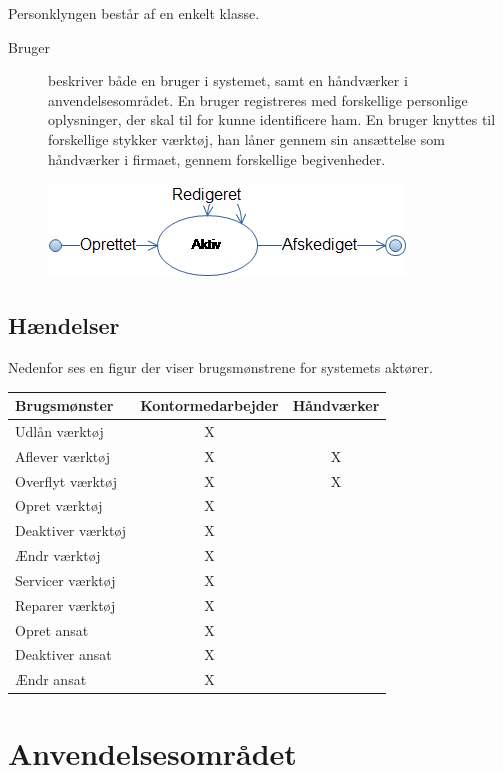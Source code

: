 \documentclass{article}
\begin{document}
Personklyngen består af en enkelt klasse.

\begin{description}

\item[Bruger] beskriver både en bruger i systemet, samt en håndværker i anvendelsesområdet. En bruger registreres med forskellige personlige oplysninger, der skal til for kunne identificere ham. En bruger knyttes til forskellige stykker værktøj, han låner gennem sin ansættelse som håndværker i firmaet, gennem forskellige begivenheder.

\end{description}

\begin{figure}[htbp]
\includegraphics[scale=0.75]{./figures/AnsatTilstandsdiagram.png}
\end{figure}

\subsection{Hændelser}

Nedenfor ses en figur der viser brugsmønstrene for systemets aktører. 

\begin{tabular}{p{4cm} c c}
\hline
{\bf Brugsmønster} & {\bf Kontormedarbejder} & {\bf Håndværker} \\
\hline
Udlån værktøj & X & \\
Aflever værktøj & X & X \\
Overflyt værktøj & X & X \\
Opret værktøj & X & \\
Deaktiver værktøj & X & \\
Ændr værktøj & X & \\
Servicer værktøj & X & \\
Reparer værktøj & X & \\
Opret ansat & X & \\
Deaktiver ansat & X & \\
Ændr ansat & X & \\
\end{tabular}
\section{Anvendelsesområdet}
\end{document}
